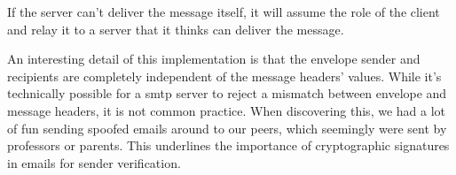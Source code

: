 If the server can't deliver the message itself, it will assume the role of the client and relay it to a server that it thinks can deliver the message.

An interesting detail of this implementation is that the envelope sender and recipients are completely independent of the message headers' values. While it's technically possible for a \gls{smtp} server to reject a mismatch between envelope and message headers, it is not common practice. When discovering this, we had a lot of fun sending spoofed emails around to our peers, which seemingly were sent by professors or parents. This underlines the importance of cryptographic signatures in emails for sender verification.